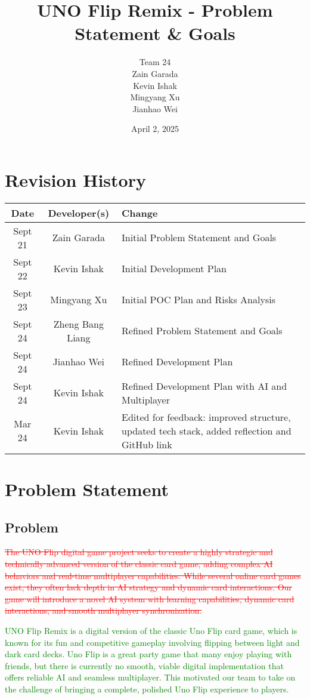 \documentclass[12pt]{article}
\title{UNO Flip Remix - Problem Statement \& Goals}
\author{Team 24\\ Zain Garada \\ Kevin Ishak \\ Mingyang Xu \\ Jianhao Wei \\ \removed{Zheng Bang Liang}}
\date{April 2, 2025}
\newcommand{\removed}[1]{\textcolor{red}{\sout{#1}}}
\newcommand{\added}[1]{\textcolor{green}{#1}}
\begin{document}
\maketitle

\section*{Revision History}
\begin{center}
\renewcommand{\arraystretch}{1.2}
\begin{tabular}{|c|c|m{9cm}|}
\hline
\textbf{Date} & \textbf{Developer(s)} & \textbf{Change} \\
\hline
Sept 21 & Zain Garada & Initial Problem Statement and Goals \\
Sept 22 & Kevin Ishak & Initial Development Plan \\
Sept 23 & Mingyang Xu & Initial POC Plan and Risks Analysis \\
Sept 24 & Zheng Bang Liang & Refined Problem Statement and Goals \\
Sept 24 & Jianhao Wei & Refined Development Plan \\
Sept 24 & Kevin Ishak & Refined Development Plan with AI and Multiplayer \\
Mar 24 & Kevin Ishak & Edited for feedback: improved structure, updated tech stack, added reflection and GitHub link\\
\hline
\end{tabular}
\end{center}

\section*{Problem Statement}

\subsection*{Problem}
\removed{The UNO Flip digital game project seeks to create a highly strategic and technically advanced version of the classic card game, adding complex AI behaviors and real-time multiplayer capabilities. While several online card games exist, they often lack depth in AI strategy and dynamic card interactions. Our game will introduce a novel AI system with learning capabilities, dynamic card interactions, and smooth multiplayer synchronization.}

\added{UNO Flip Remix is a digital version of the classic Uno Flip card game, which is known for its fun and competitive gameplay involving flipping between light and dark card decks. Uno Flip is a great party game that many enjoy playing with friends, but there is currently no smooth, viable digital implementation that offers reliable AI and seamless multiplayer. This motivated our team to take on the challenge of bringing a complete, polished Uno Flip experience to players.}
\end{document}
